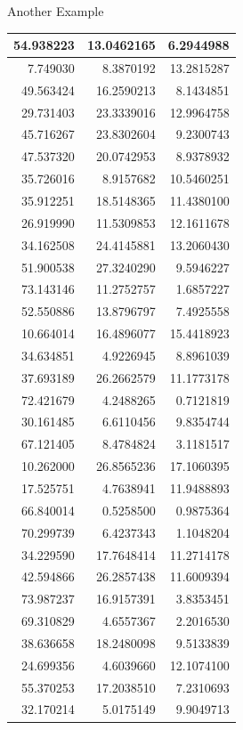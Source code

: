 \documentclass[
  ignorenonframetext,
]{beamer}
\begin{document}
\begin{frame}{Another Example}
\begin{table}
\begin{tabular}[t]{r|r|r}
\hline
54.938223 & 13.0462165 & 6.2944988\\
\hline
7.749030 & 8.3870192 & 13.2815287\\
\hline
49.563424 & 16.2590213 & 8.1434851\\
\hline
29.731403 & 23.3339016 & 12.9964758\\
\hline
45.716267 & 23.8302604 & 9.2300743\\
\hline
47.537320 & 20.0742953 & 8.9378932\\
\hline
35.726016 & 8.9157682 & 10.5460251\\
\hline
35.912251 & 18.5148365 & 11.4380100\\
\hline
26.919990 & 11.5309853 & 12.1611678\\
\hline
34.162508 & 24.4145881 & 13.2060430\\
\hline
51.900538 & 27.3240290 & 9.5946227\\
\hline
73.143146 & 11.2752757 & 1.6857227\\
\hline
52.550886 & 13.8796797 & 7.4925558\\
\hline
10.664014 & 16.4896077 & 15.4418923\\
\hline
34.634851 & 4.9226945 & 8.8961039\\
\hline
37.693189 & 26.2662579 & 11.1773178\\
\hline
72.421679 & 4.2488265 & 0.7121819\\
\hline
30.161485 & 6.6110456 & 9.8354744\\
\hline
67.121405 & 8.4784824 & 3.1181517\\
\hline
10.262000 & 26.8565236 & 17.1060395\\
\hline
17.525751 & 4.7638941 & 11.9488893\\
\hline
66.840014 & 0.5258500 & 0.9875364\\
\hline
70.299739 & 6.4237343 & 1.1048204\\
\hline
34.229590 & 17.7648414 & 11.2714178\\
\hline
42.594866 & 26.2857438 & 11.6009394\\
\hline
73.987237 & 16.9157391 & 3.8353451\\
\hline
69.310829 & 4.6557367 & 2.2016530\\
\hline
38.636658 & 18.2480098 & 9.5133839\\
\hline
24.699356 & 4.6039660 & 12.1074100\\
\hline
55.370253 & 17.2038510 & 7.2310693\\
\hline
32.170214 & 5.0175149 & 9.9049713\\

\end{tabular}
\end{table}
\end{frame}
\end{document}
